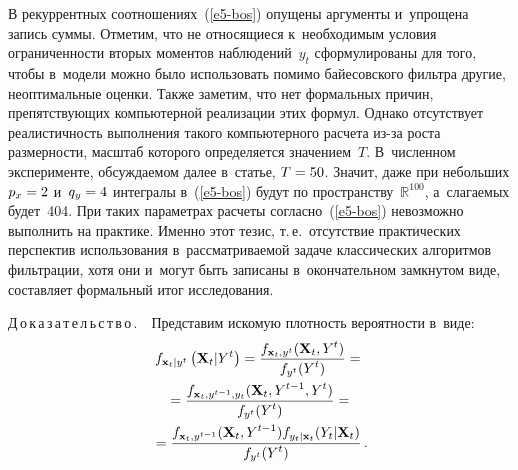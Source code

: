 \begin{multicols}{2}
     В рекуррентных соотношениях~(\ref{e5-bos}) опущены аргументы 
и~упрощена запись суммы. Отметим, что не от\-но\-ся\-щи\-еся к~необходимым 
условия огра\-ни\-чен\-ности вторых моментов наблюдений~$y_t$ 
сформулированы для того, чтобы в~модели можно было использовать 
помимо байесовского фильт\-ра другие, неоптимальные оцен\-ки. Также 
заметим, что нет формальных причин, пре\-пят\-ст\-ву\-ющих компьютерной 
реализации этих формул. Однако отсутствует ре\-а\-ли\-стич\-ность выполнения 
такого компьютерного расчета из-за рос\-та раз\-мер\-ности, мас\-штаб которого 
определяется значением~$T$. В~чис\-лен\-ном эксперименте, об\-суж\-да\-емом 
далее в~\mbox{статье}, $T\hm=50$. Значит, даже при небольших $p_x\hm=2$ 
и~$q_y\hm=4$ интегралы в~(\ref{e5-bos}) будут по 
пространству~$\mathbb{R}^{100}$, а~сла\-га\-емых будет~404. При таких 
па\-ра\-мет\-рах расчеты со\-глас\-но~(\ref{e5-bos}) невозможно выполнить на 
практике. Именно этот тезис, т.\,е.\ отсутствие практических перспектив 
использования в~рас\-смат\-ри\-ва\-емой задаче классических алгоритмов 
фильт\-ра\-ции, хотя они и~могут быть записаны в~окончательном замкнутом 
виде, со\-став\-ля\-ет формальный итог исследования.
     
     \noindent
     Д\,о\,к\,а\,з\,а\,т\,е\,л\,ь\,с\,т\,в\,о\,.\ \ Представим искомую плот\-ность 
ве\-ро\-ят\-ности в~виде:
     \begin{multline*}
     f_{\mathbf{x}_t\vert y^t} \left( \mathbf{X}_t\vert Y^t\right) 
=\displaystyle\frac{\displaystyle f_{\mathbf{x}_t, y^t} (\mathbf{X}_t, Y^t)\mathstrut}{\displaystyle f_{y^t}(Y^t)\mathstrut} = {}\\
{}=
\displaystyle\frac{\displaystyle f_{\mathbf{x}_t, y^{t-1}, y_t} (\mathbf{X}_t, Y^{t-1}, Y^t)\mathstrut}{\displaystyle  f_{y^t}(Y^t)\mathstrut} 
={}\\
{}= \displaystyle\frac{\displaystyle f_{\mathbf{x}_t, y^{t-1}} (\mathbf{X}_t, Y^{t-1}) 
f_{y_t\vert\mathbf{x}_t} (Y_t\vert \mathbf{X}_t)\mathstrut}{\displaystyle  f_{y^t}(Y^t)\mathstrut}\,.
     \end{multline*}
     

\end{multicols}
